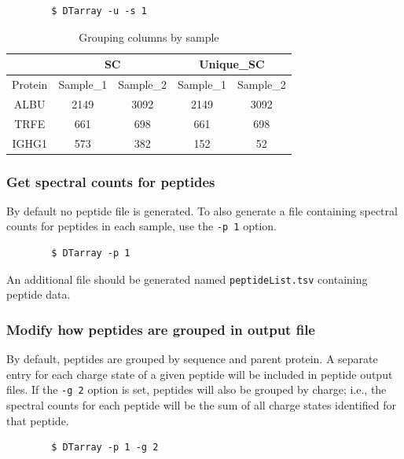 \documentclass[12pt]{article}
\begin{document}
	\begin{lstlisting}
		$ DTarray -u -s 1
	\end{lstlisting}
	
	\begin{table}[h!]
		\centering
		\footnotesize
		\begin{tabular}{ccccc}
			\toprule
			& \multicolumn{2}{c}{SC}
			& \multicolumn{2}{c}{Unique\_SC} \\
			\midrule
			Protein & Sample\_1 & Sample\_2 & Sample\_1 & Sample\_2 \\ 
			\midrule
			ALBU & 2149 & 3092 & 2149 & 3092 \\
			TRFE & 661 & 698 & 661 & 698 \\ 
			IGHG1 & 573 & 382 & 152 & 52 \\ 
			\toprule
		\end{tabular}
		\caption{Grouping columns by sample}
		\label{table:s_1}
	\end{table}
	
	\subsubsection{Get spectral counts for peptides}
	
	\noindent
	By default no peptide file is generated.  To also generate a file containing spectral counts for peptides in each sample, use the \texttt{-p 1} option.
	
	\begin{lstlisting}
		$ DTarray -p 1
	\end{lstlisting}
	
	\noindent
	An additional file should be generated named \texttt{peptideList.tsv} containing peptide data.
	
	\subsubsection{Modify how peptides are grouped in output file}
	
	\noindent
	By default, peptides are grouped by sequence and parent protein.  A separate entry for each	charge state of a given peptide will be  included  in  peptide	output files.  If the \texttt{-g 2} option is set, peptides will also be grouped by charge; i.e., the spectral counts for each peptide will be the sum of all charge states identified for that peptide.
	
	\begin{lstlisting}
		$ DTarray -p 1 -g 2
	\end{lstlisting}
	
\end{document}
